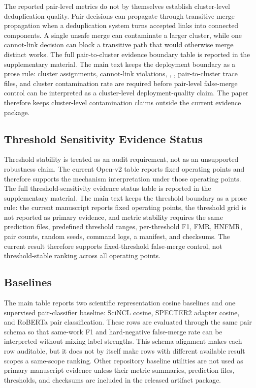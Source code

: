 \documentclass[preprint,12pt]{elsarticle}
\begin{document}
The reported pair-level metrics do not by themselves establish cluster-level deduplication quality. Pair decisions can propagate through transitive merge propagation when a deduplication system turns accepted links into connected components. A single unsafe merge can contaminate a larger cluster, while one cannot-link decision can block a transitive path that would otherwise merge distinct works. The full pair-to-cluster evidence boundary table is reported in the supplementary material. The main text keeps the deployment boundary as a prose rule: cluster assignments, cannot-link violations, , , pair-to-cluster trace files, and cluster contamination rate are required before pair-level false-merge control can be interpreted as a cluster-level deployment-quality claim. The paper therefore keeps cluster-level contamination claims outside the current evidence package.

\subsection{Threshold Sensitivity Evidence Status}

Threshold stability is treated as an audit requirement, not as an unsupported robustness claim. The current Open-v2 table reports fixed operating points and therefore supports the mechanism interpretation under those operating points. The full threshold-sensitivity evidence status table is reported in the supplementary material. The main text keeps the threshold boundary as a prose rule: the current manuscript reports fixed operating points, the threshold grid is not reported as primary evidence, and metric stability requires the same prediction files, predefined threshold ranges, per-threshold F1, FMR, HNFMR, pair counts, random seeds, command logs, a manifest, and checksums. The current result therefore supports fixed-threshold false-merge control, not threshold-stable ranking across all operating points.

\subsection{Baselines}

The main table reports two scientific representation cosine baselines and one supervised pair-classifier baseline: SciNCL cosine, SPECTER2 adapter cosine, and RoBERTa pair classification. These rows are evaluated through the same pair schema so that same-work F1 and hard-negative false-merge rate can be interpreted without mixing label strengths. This schema alignment makes each row auditable, but it does not by itself make rows with different available result scopes a same-scope ranking. Other repository baseline utilities are not used as primary manuscript evidence unless their metric summaries, prediction files, thresholds, and checksums are included in the released artifact package.
\end{document}
